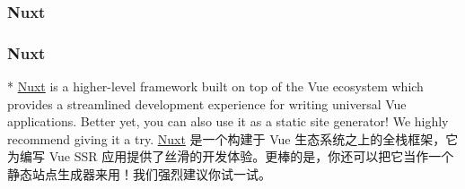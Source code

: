 \begin{paracol}{2}
\subsubsection{Nuxt}
\switchcolumn
\subsubsection{Nuxt}
\switchcolumn[0]*%
\href{https://nuxt.com/}{Nuxt} is a higher-level framework built on top
of the Vue ecosystem which provides a streamlined development experience
for writing universal Vue applications. Better yet, you can also use it
as a static site generator! We highly recommend giving it a try.
\switchcolumn
\href{https://nuxt.com/}{Nuxt} 是一个构建于 Vue
生态系统之上的全栈框架，它为编写 Vue SSR
应用提供了丝滑的开发体验。更棒的是，你还可以把它当作一个静态站点生成器来用！我们强烈建议你试一试。
\end{paracol}


